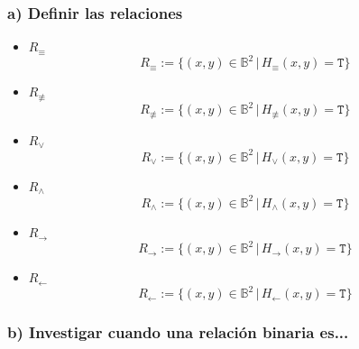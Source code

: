 \documentclass{article}
\begin{document}
\subsubsection{a) Definir las relaciones}
\begin{itemize}
    \item $R_{\equiv}$
    \begin{equation*}
        R_{\equiv} := \{(x, y) \in \mathbb{B}^2\, \vert\, H_{\equiv}(x, y) = \texttt{T}\}
    \end{equation*}
    \item $R_{\not\equiv}$
    \begin{equation*}
        R_{\not\equiv} := \{(x, y) \in \mathbb{B}^2\, \vert\, H_{\not\equiv}(x, y) = \texttt{T}\}
    \end{equation*}
    \item $R_{\vee}$
    \begin{equation*}
        R_{\vee} := \{(x, y) \in \mathbb{B}^2\, \vert\, H_{\vee}(x, y) = \texttt{T}\}
    \end{equation*}
    \item $R_{\wedge}$
    \begin{equation*}
        R_{\wedge} := \{(x, y) \in \mathbb{B}^2\, \vert\, H_{\wedge}(x, y) = \texttt{T}\}
    \end{equation*}
    \item $R_{\to}$
    \begin{equation*}
        R_{\to} := \{(x, y) \in \mathbb{B}^2\, \vert\, H_{\to}(x, y) = \texttt{T}\}
    \end{equation*}
    \item $R_{\gets}$
    \begin{equation*}
        R_{\gets} := \{(x, y) \in \mathbb{B}^2\, \vert\, H_{\gets}(x, y) = \texttt{T}\}
    \end{equation*}
\end{itemize}
\subsubsection{b) Investigar cuando una relación binaria es...}
\end{document}
